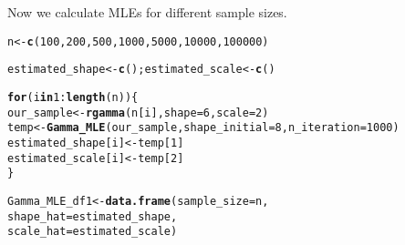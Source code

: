 \documentclass[11pt, a4paper]{article}\usepackage[]{graphicx}\usepackage[]{xcolor}
\makeatletter
\newcommand{\hlnum}[1]{\textcolor[rgb]{0.686,0.059,0.569}{#1}}%
\newcommand{\hlopt}[1]{\textcolor[rgb]{0,0,0}{#1}}%
\newcommand{\hldef}[1]{\textcolor[rgb]{0.345,0.345,0.345}{#1}}%
\newcommand{\hlkwa}[1]{\textcolor[rgb]{0.161,0.373,0.58}{\textbf{#1}}}%
\newcommand{\hlkwb}[1]{\textcolor[rgb]{0.69,0.353,0.396}{#1}}%
\newcommand{\hlkwc}[1]{\textcolor[rgb]{0.333,0.667,0.333}{#1}}%
\newcommand{\hlkwd}[1]{\textcolor[rgb]{0.737,0.353,0.396}{\textbf{#1}}}%
\newenvironment{kframe}{%
 \def\at@end@of@kframe{}%
 \ifinner\ifhmode%
  \def\at@end@of@kframe{\end{minipage}}%
  \begin{minipage}{\columnwidth}%
 \fi\fi%
 \def\FrameCommand##1{\hskip\@totalleftmargin \hskip-\fboxsep
 \colorbox{shadecolor}{##1}\hskip-\fboxsep
     \hskip-\linewidth \hskip-\@totalleftmargin \hskip\columnwidth}%
 \MakeFramed {\advance\hsize-\width
   \@totalleftmargin\z@ \linewidth\hsize
   \@setminipage}}%
 {\par\unskip\endMakeFramed%
 \at@end@of@kframe}
\newenvironment{knitrout}{}{} %
\makeatother
\begin{document}
Now we calculate MLEs for different sample sizes.

\begin{knitrout}
\color{fgcolor}\begin{kframe}
\begin{alltt}
\hldef{n} \hlkwb{<-} \hlkwd{c}\hldef{(}\hlnum{100}\hldef{,} \hlnum{200}\hldef{,} \hlnum{500}\hldef{,} \hlnum{1000}\hldef{,} \hlnum{5000}\hldef{,} \hlnum{10000}\hldef{,} \hlnum{100000}\hldef{)}
\end{alltt}
\end{kframe}
\end{knitrout}

\begin{knitrout}
\color{fgcolor}\begin{kframe}
\begin{alltt}
\hldef{estimated_shape} \hlkwb{<-} \hlkwd{c}\hldef{(); estimated_scale} \hlkwb{<-} \hlkwd{c}\hldef{()}
\end{alltt}
\end{kframe}
\end{knitrout}

\begin{knitrout}
\color{fgcolor}\begin{kframe}
\begin{alltt}
\hlkwa{for} \hldef{(i} \hlkwa{in} \hlnum{1}\hlopt{:}\hlkwd{length}\hldef{(n)) \{}
  \hldef{our_sample} \hlkwb{<-} \hlkwd{rgamma}\hldef{(n[i],} \hlkwc{shape} \hldef{=} \hlnum{6}\hldef{,} \hlkwc{scale} \hldef{=} \hlnum{2}\hldef{)}
  \hldef{temp} \hlkwb{<-} \hlkwd{Gamma_MLE}\hldef{(our_sample,} \hlkwc{shape_initial} \hldef{=} \hlnum{8}\hldef{,} \hlkwc{n_iteration} \hldef{=} \hlnum{1000}\hldef{)}
  \hldef{estimated_shape[i]} \hlkwb{<-} \hldef{temp[}\hlnum{1}\hldef{]}
  \hldef{estimated_scale[i]} \hlkwb{<-} \hldef{temp[}\hlnum{2}\hldef{]}
\hldef{\}}
\end{alltt}
\end{kframe}
\end{knitrout}

\begin{knitrout}
\color{fgcolor}\begin{kframe}
\begin{alltt}
\hldef{Gamma_MLE_df1} \hlkwb{<-} \hlkwd{data.frame}\hldef{(}\hlkwc{sample_size} \hldef{= n,}
                            \hlkwc{shape_hat} \hldef{= estimated_shape,}
                            \hlkwc{scale_hat} \hldef{= estimated_scale)}
\end{alltt}
\end{kframe}
\end{knitrout}
\end{document}
